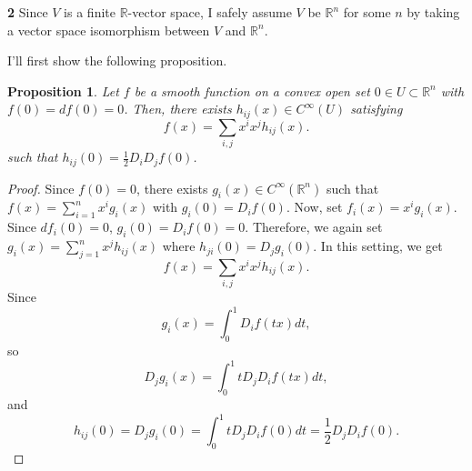 \documentclass[a4paper, 12pt]{article}
\theoremstyle{Mydefinition}
\theoremstyle{Mytheorem}
\newtheorem{proposition}[statement]{Proposition}
\begin{document}
\noindent \textbf{2}
Since $V$ is a finite $\mathbb{R}$-vector space, I safely assume $V$ be $\mathbb{R}^n$ for some $n$ by taking a vector space isomorphism between $V$ and $\mathbb{R}^n$.

I'll first show the following proposition.
\begin{proposition}\label{HW6:2_prop1}
    Let $f$ be a smooth function on a convex open set $0\in U\subset \mathbb{R}^n$ with $f(0)=df(0) = 0$. Then, there exists $h_{ij}(x)\in C^\infty(U)$ satisfying
    \begin{equation}
        f(x) = \sum_{i,j} x^i x^j h_{ij}(x).
    \end{equation}
    such that $h_{ij}(0) = \frac{1}{2}D_i D_j f(0)$.
\end{proposition}
\begin{proof}
Since $f(0) = 0$, there exists $g_i(x)\in C^\infty(\mathbb{R}^n)$ such that $f(x) = \sum_{i=1}^n x^ig_i(x)$ with $g_i(0) = D_i f(0)$. Now, set $f_i(x) = x^ig_i(x)$. Since $df_i(0) = 0$, $g_i(0) = D_if(0) = 0$. Therefore, we again set $g_i(x) = \sum_{j=1}^n x^j h_{ij}(x)$ where $h_{ji}(0)= D_jg_i(0)$.
In this setting, we get
\begin{equation*}
    f(x) = \sum_{i,j}x^ix^jh_{ij}(x).
\end{equation*}
Since
\begin{equation*}
    g_i(x) = \int_0^1 D_i f(tx)dt,
\end{equation*}
so
\begin{equation*}
    D_j g_i(x) = \int_0^1 t D_j D_if(tx)dt,
\end{equation*}
and
\begin{equation*}
    h_{ij}(0) = D_j g_i(0) = \int_0^1 t D_j D_i f(0) dt = \frac{1}{2} D_j D_i f(0).
\end{equation*}
\end{proof}
\end{document}
